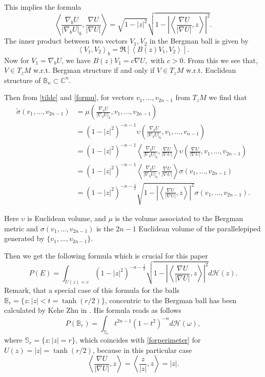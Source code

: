 \documentclass[11pt]{amsart}
\numberwithin{equation}{section}
\begin{document}
This implies the formula \begin{equation}\label{formu}
\left<\frac{\nabla_b U}{|\nabla_b U|_b}, \frac{\nabla U}{|\nabla U|}\right>= \sqrt{1-|z|^2}\sqrt{1-\left|\left< \frac{\nabla U}{|\nabla U|}, z\right>\right|^2}.
\end{equation}
The inner product between two vectors $V_1, V_2$ in the Bergman ball is given by $$\left<V_1, V_2\right>_b= \Re[\left< B(z)V_1, V_2\right>].$$ Now for $V_1=\nabla_b U$, we have $B(z) V_1 = c \nabla U,$ with $c>0$. From this we see that, $V\in T_zM$ w.r.t. Bergman structure if and only if  $V\in T_zM$ w.r.t. Euclidean structure of $\mathbb{B}_n\subset \mathbb{C}^n$.

Then from \eqref{tilde} and \eqref{formu}, for vectors $v_1,\dots, v_{2n-1}$ from $T_zM$ we find that
\[\begin{split} \tilde \sigma(v_1, \dots, v_{2n-1})&=\mu\left(\frac{\nabla_b U}{|\nabla_b U|_b}, v_1, \dots, v_{2n-1}\right)
\\& =(1-|z|^2)^{-n-1}\upsilon\left(\frac{\nabla_b U}{|\nabla_b U|_b}, v_1, \dots, v_{n-1}\right)
 \\&= (1-|z|^2)^{-n-1}\left<\frac{\nabla_b U}{|\nabla_b U|_b}, \frac{\nabla U}{|\nabla U|}\right> \upsilon\left(\frac{\nabla U}{|\nabla U|},v_1, \dots, v_{2n-1}\right)
\\&=(1-|z|^2)^{-n-1} \left<\frac{\nabla_b U}{|\nabla_b U|_b}, \frac{\nabla U}{|\nabla U|}\right> \sigma(v_1, \dots, v_{2n-1})
\\&= (1-|z|^2)^{-n-\frac{1}{2}} \sqrt{1-\left|\left< \frac{\nabla U}{|\nabla U|}, z\right>\right|^2} \sigma(v_1, \dots, v_{2n-1}).
\end{split}\]

Here $\upsilon$ is Euclidean volume, and $\mu$ is the volume associated to the Bergman metric and  $\sigma(v_1, \dots, v_{2n-1})$ is the $2n-1$ Euclidean volume of the parallelepiped generated by $\{v_1,\dots, v_{2n-1}\}$.


Then we get the following formula which is crucial for this paper \begin{equation}\label{forperimeter}P(E) = \int_{U(z) =c}(1-|z|^2)^{-n-\frac{1}{2}} \sqrt{1-\left|\left< \frac{\nabla U}{|\nabla U|}, z\right>\right|^2}d\mathcal{H}(z).\end{equation} Remark, that a special case of this formula for the balls $\mathbb{B}_r=\{z: |z|<t=\tanh(r/2)\}$, concentric to the Bergman ball has been calculated by Kehe Zhu in \cite[Sect.~1.6]{kezu}. His formula reads as follows
\begin{equation}\label{br}
P(\mathbb{B}_r) = \int_{\mathbb{S}_r}t^{2n-1}(1-t^2)^{-n} d\mathcal{H}(\omega),
\end{equation}
where $\mathbb{S}_r=\{z: |z|=r\}$, which coincides with \eqref{forperimeter} for $U(z) = |z|=\tanh(r/2)$, because in this particular case $$\left< \frac{\nabla U}{|\nabla U|}, z\right>=\left<\frac{z}{|z|},z\right>=|z|.$$
\end{document}
